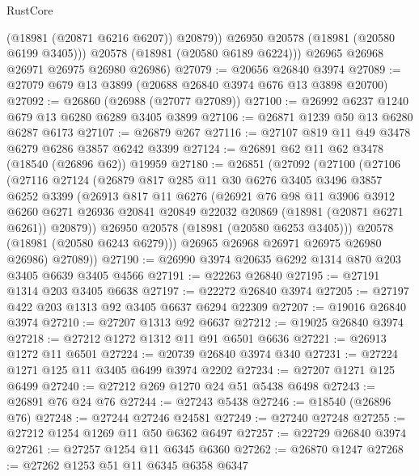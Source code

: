 \begin{lexlean}{RustCore}
\begin{coremodule}
              (@18981 (@20871 @6216 @6207))
              @20879))
          @26950
          @20578
          (@18981 (@20580 @6199 @3405)))
        @20578
        (@18981 (@20580 @6189 @6224)))
      @26965
      @26968
      @26971
      @26975
      @26980
      @26986)
@27079 := @20656 @26840 @3974
@27089 := @27079 @679 @13 @3899 (@20688 @26840 @3974 @676 @13 @3898 @20700)
@27092 := @26860 (@26988 (@27077 @27089))
@27100 := @26992 @6237 @1240 @679 @13 @6280 @6289 @3405 @3899
@27106 := @26871 @1239 @50 @13 @6280 @6287 @6173
@27107 := @26879 @267
@27116 := @27107 @819 @11 @49 @3478 @6279 @6286 @3857 @6242 @3399
@27124 := @26891 @62 @11 @62 @3478 (@18540 (@26896 @62)) @19959
@27180 := @26851
    (@27092
      (@27100
        (@27106
          (@27116
            @27124
            (@26879
              @817
              @285
              @11
              @30
              @6276
              @3405
              @3496
              @3857
              @6252
              @3399
              (@26913
                @817
                @11
                @6276
                (@26921
                  @76
                  @98
                  @11
                  @3906
                  @3912
                  @6260
                  @6271
                  @26936
                  @20841
                  @20849
                  @22032
                  @20869
                  (@18981 (@20871 @6271 @6261))
                  @20879))
              @26950
              @20578
              (@18981 (@20580 @6253 @3405)))
            @20578
            (@18981 (@20580 @6243 @6279)))
          @26965
          @26968
          @26971
          @26975
          @26980
          @26986)
        @27089))
@27190 := @26990 @3974 @20635 @6292 @1314 @870 @203 @3405 @6639 @3405 @4566
@27191 := @22263 @26840
@27195 := @27191 @1314 @203 @3405 @6638
@27197 := @22272 @26840 @3974
@27205 := @27197 @422 @203 @1313 @92 @3405 @6637 @6294 @22309
@27207 := @19016 @26840 @3974
@27210 := @27207 @1313 @92 @6637
@27212 := @19025 @26840 @3974
@27218 := @27212 @1272 @1312 @11 @91 @6501 @6636
@27221 := @26913 @1272 @11 @6501
@27224 := @20739 @26840 @3974 @340
@27231 := @27224 @1271 @125 @11 @3405 @6499 @3974 @2202
@27234 := @27207 @1271 @125 @6499
@27240 := @27212 @269 @1270 @24 @51 @5438 @6498
@27243 := @26891 @76 @24 @76
@27244 := @27243 @5438
@27246 := @18540 (@26896 @76)
@27248 := @27244 @27246 @24581
@27249 := @27240 @27248
@27255 := @27212 @1254 @1269 @11 @50 @6362 @6497
@27257 := @22729 @26840 @3974
@27261 := @27257 @1254 @11 @6345 @6360
@27262 := @26870 @1247
@27268 := @27262 @1253 @51 @11 @6345 @6358 @6347

\end{coremodule}
\end{lexlean}
